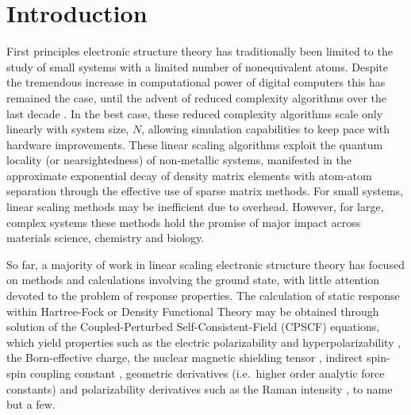 \documentclass[prl,aps,preprint,showpacs,superbib]{revtex4}
\begin{document}
%
%
%
%

\section{Introduction}
First principles electronic structure theory has traditionally been limited 
to the study of small systems with a limited number of nonequivalent atoms. 
Despite the tremendous increase in computational power of digital computers this 
has remained the case, until the advent of reduced complexity algorithms over the
last decade \cite{GGalli96,DBowler97,SGoedecker99,POrdejon00,VGogonea01,SWu02}. In the 
best case, these reduced complexity algorithms scale only linearly with system size, $N$, 
allowing simulation capabilities to keep pace with hardware improvements.
These linear scaling algorithms exploit the quantum locality (or nearsightedness) of 
non-metallic systems,  manifested in the approximate exponential decay of density matrix elements 
with atom-atom separation through the effective use of sparse matrix methods. For small systems,
linear scaling methods may be inefficient due to overhead.  However, for large, complex systems
these methods hold the promise of major impact across materials science, chemistry and biology. 

So far, a majority of work in linear scaling electronic structure theory 
has focused on methods and calculations involving the ground state, with little 
attention devoted to the problem of response properties.  The calculation of static
response within  Hartree-Fock or Density Functional Theory may be  obtained through solution 
of the Coupled-Perturbed Self-Consistent-Field (CPSCF) equations, which yield properties 
such as the electric polarizability and hyperpolarizability \cite{HSekino86,SKarna91}, 
the Born-effective charge, the nuclear magnetic shielding tensor \cite{KWolinski90}, 
indirect spin-spin coupling
constant \cite{CPennington91,OMalkin96}, geometric derivatives (i.e.~higher order
analytic force constants) \cite{RAmos89} and polarizability derivatives such as the Raman 
intensity \cite{MLazzeri03,OQuinet01}, to name but a few.
\end{document}
